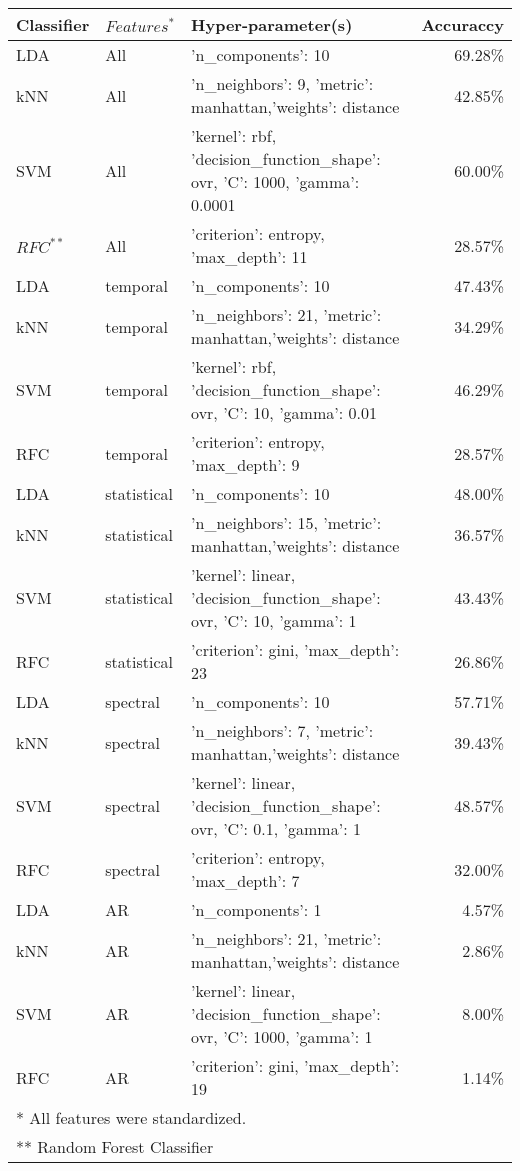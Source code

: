 {\small
\begin{tabular}{lllr}
\toprule
Classifier & $Features^{*}$ & Hyper-parameter(s) & Accuraccy \\
\midrule
LDA & All & {'n\_components': 10 }& 69.28\% \\
kNN & All & {'n\_neighbors': 9, 'metric': manhattan,'weights': distance }& 42.85\% \\
SVM & All & {'kernel': rbf, 'decision\_function\_shape': ovr, 'C': 1000, 'gamma': 0.0001 }& 60.00\%                 \\
$RFC^{**}$ & All & {'criterion': entropy, 'max\_depth': 11 }& 28.57\% \\ \hline



LDA & temporal & {'n\_components': 10 }& 47.43\%   \\
kNN & temporal & {'n\_neighbors': 21, 'metric': manhattan,'weights': distance}& 34.29\%    \\
SVM & temporal & {'kernel': rbf, 'decision\_function\_shape': ovr, 'C': 10, 'gamma': 0.01}& 46.29\%   \\
RFC & temporal & {'criterion': entropy, 'max\_depth': 9 }& 28.57\%     \\ \hline




LDA & statistical & {'n\_components': 10 }& 48.00\% \\
kNN & statistical & {'n\_neighbors': 15, 'metric': manhattan,'weights': distance }& 36.57\%               \\
SVM & statistical & {'kernel': linear, 'decision\_function\_shape': ovr, 'C': 10, 'gamma': 1 }& 43.43\% \\
RFC & statistical & {'criterion': gini, 'max\_depth': 23 }& 26.86\%     \\ \hline


 
 
 
 LDA & spectral & {'n\_components': 10 }& 57.71\%               \\
kNN & spectral & {'n\_neighbors': 7, 'metric': manhattan,'weights': distance }& 39.43\%               \\
SVM & spectral & {'kernel': linear, 'decision\_function\_shape': ovr, 'C': 0.1, 'gamma': 1 }& 48.57\%                 \\
RFC & spectral & {'criterion': entropy, 'max\_depth': 7 }& 32.00\%     \\ \hline


 
LDA & AR & {'n\_components': 1 }& 4.57\%               \\
kNN & AR & {'n\_neighbors': 21, 'metric': manhattan,'weights': distance }& 2.86\%               \\
SVM & AR & {'kernel': linear, 'decision\_function\_shape': ovr, 'C': 1000, 'gamma': 1 }& 8.00\%  \\
RFC & AR & {'criterion': gini, 'max\_depth': 19 }& 1.14\%     \\ 
\bottomrule
\multicolumn{3}{l}{ *   All features were standardized.}\\
\multicolumn{3}{l}{** Random Forest Classifier}
\end{tabular}
}
